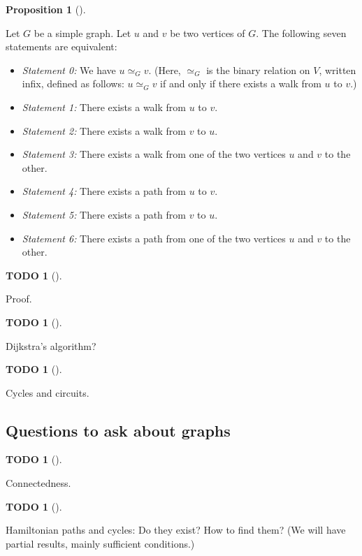 \documentclass[numbers=enddot,12pt,final,onecolumn,notitlepage]{scrartcl}%
\theoremstyle{definition}
\newtheorem{prop}[theo]{Proposition}
\newenvironment{proposition}[1][]
{\begin{prop}[#1]\begin{leftbar}}
{\end{leftbar}\end{prop}}
\newtheorem{quest}[theo]{TODO}
\newenvironment{todo}[1][]
{\begin{quest}[#1]\begin{leftbar}}
{\end{leftbar}\end{quest}}
\begin{document}
\begin{proposition} \label{prop.intro.paths-and-walks}
Let $G$ be a simple graph. Let $u$ and $v$ be two vertices of $G$.
The following seven statements are equivalent:

\begin{itemize}
\item \textit{Statement 0:} We have $u \simeq_G v$. (Here, $\simeq_G$
is the binary relation on $V$, written infix, defined as follows:
$u \simeq_G v$ if and only if there exists a walk from $u$ to $v$.)

\item \textit{Statement 1:} There exists a walk from $u$ to $v$.

\item \textit{Statement 2:} There exists a walk from $v$ to $u$.

\item \textit{Statement 3:} There exists a walk from one of the two
vertices $u$ and $v$ to the other.

\item \textit{Statement 4:} There exists a path from $u$ to $v$.

\item \textit{Statement 5:} There exists a path from $v$ to $u$.

\item \textit{Statement 6:} There exists a path from one of the two
vertices $u$ and $v$ to the other.
\end{itemize}
\end{proposition}

\begin{todo}
Proof.
\end{todo}

\begin{todo}
Dijkstra's algorithm?
\end{todo}

\begin{todo}
Cycles and circuits.
\end{todo}

\subsection{\label{sect.intro.teasers}Questions to ask about graphs}

\begin{todo}
Connectedness.
\end{todo}

\begin{todo}
Hamiltonian paths and cycles:
Do they exist? How to find them? (We will have partial results, mainly sufficient conditions.)
\end{todo}
\end{document}

